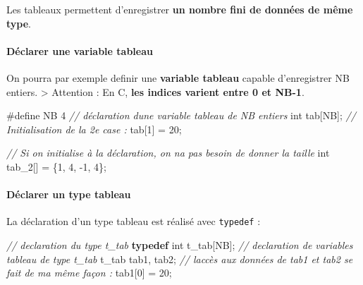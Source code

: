 \documentclass[11pt]{article}
\newenvironment{Shaded}{}{}
\newcommand{\KeywordTok}[1]{\textcolor[rgb]{0.00,0.44,0.13}{\textbf{{#1}}}}
\newcommand{\DataTypeTok}[1]{\textcolor[rgb]{0.56,0.13,0.00}{{#1}}}
\newcommand{\DecValTok}[1]{\textcolor[rgb]{0.25,0.63,0.44}{{#1}}}
\newcommand{\CommentTok}[1]{\textcolor[rgb]{0.38,0.63,0.69}{\textit{{#1}}}}
\newcommand{\NormalTok}[1]{{#1}}
\newcommand{\PreprocessorTok}[1]{\textcolor[rgb]{0.74,0.48,0.00}{{#1}}}
\begin{document}
Les tableaux permettent d'enregistrer \textbf{un nombre fini de données
de même type}.

\hypertarget{duxe9clarer-une-variable-tableau}{%
\paragraph{Déclarer une variable
tableau}\label{duxe9clarer-une-variable-tableau}}

On pourra par exemple definir une \textbf{variable tableau} capable
d'enregistrer NB entiers. \textgreater{} Attention : En C, \textbf{les
indices varient entre 0 et NB-1}.

\begin{Shaded}
\begin{Highlighting}[]
    \PreprocessorTok{\#define NB 4}
    \CommentTok{// déclaration d\textquotesingle{}une variable tableau de NB entiers}
    \DataTypeTok{int}\NormalTok{ tab[NB]; }
    \CommentTok{// Initialisation de la 2e case : }
\NormalTok{    tab[}\DecValTok{1}\NormalTok{] = }\DecValTok{20}\NormalTok{;}

    \CommentTok{// Si on initialise à la déclaration, on n\textquotesingle{}a pas besoin de donner la taille}
    \DataTypeTok{int}\NormalTok{ tab\_2[] = \{}\DecValTok{1}\NormalTok{, }\DecValTok{4}\NormalTok{, {-}}\DecValTok{1}\NormalTok{, }\DecValTok{4}\NormalTok{\};}
\end{Highlighting}
\end{Shaded}

\hypertarget{duxe9clarer-un-type-tableau}{%
\paragraph{\texorpdfstring{Déclarer un \textbf{type
tableau}}{Déclarer un type tableau}}\label{duxe9clarer-un-type-tableau}}

La déclaration d'un type tableau est réalisé avec \texttt{typedef} :

\begin{Shaded}
\begin{Highlighting}[]
    \CommentTok{// declaration du type t\_tab }
    \KeywordTok{typedef} \DataTypeTok{int}\NormalTok{ t\_tab[NB];}
    \CommentTok{// declaration de variables tableau de type t\_tab}
\NormalTok{    t\_tab tab1, tab2;}
    \CommentTok{// l\textquotesingle{}accès aux données de tab1 et tab2 se fait de ma même façon : }
\NormalTok{    tab1[}\DecValTok{0}\NormalTok{] = }\DecValTok{20}\NormalTok{;}
\end{Highlighting}
\end{Shaded}
\end{document}

